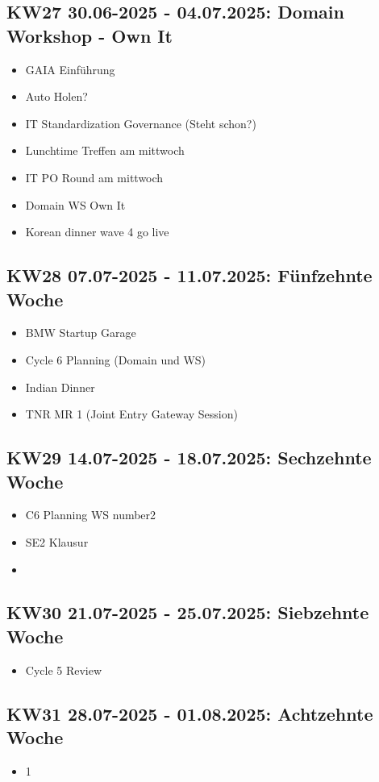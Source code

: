 \subsection{KW27 30.06-2025 - 04.07.2025: Domain Workshop - Own It}
\begin{itemize}
  \item GAIA Einführung
  \item Auto Holen?
  \item IT Standardization Governance (Steht schon?)
  \item Lunchtime Treffen am mittwoch
  \item IT PO Round am mittwoch
  \item Domain WS Own It
  \item Korean dinner wave 4 go live
\end{itemize}


\subsection{KW28 07.07-2025 - 11.07.2025: Fünfzehnte Woche}
\begin{itemize}
  \item BMW Startup Garage
  \item Cycle 6 Planning (Domain und WS)
  \item Indian Dinner
  \item TNR MR 1 (Joint Entry Gateway Session)
\end{itemize}


\subsection{KW29 14.07-2025 - 18.07.2025: Sechzehnte Woche}
\begin{itemize}
  \item C6 Planning WS number2
  \item SE2 Klausur
  \item 
\end{itemize}


\subsection{KW30 21.07-2025 - 25.07.2025: Siebzehnte Woche}
\begin{itemize}
  \item Cycle 5 Review
\end{itemize}


\subsection{KW31 28.07-2025 - 01.08.2025: Achtzehnte Woche}
\begin{itemize}
  \item 1
\end{itemize}


